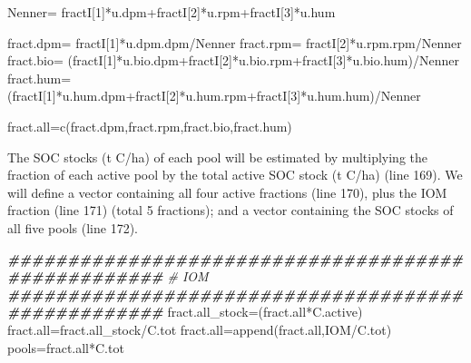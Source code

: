 \documentclass[
  10pt,
  b5paper,
]{book}
\newenvironment{Shaded}{\begin{snugshade}}{\end{snugshade}}
\newcommand{\CommentTok}[1]{\textcolor[rgb]{0.56,0.35,0.01}{\textit{#1}}}
\newcommand{\DecValTok}[1]{\textcolor[rgb]{0.00,0.00,0.81}{#1}}
\newcommand{\DocumentationTok}[1]{\textcolor[rgb]{0.56,0.35,0.01}{\textbf{\textit{#1}}}}
\newcommand{\FunctionTok}[1]{\textcolor[rgb]{0.00,0.00,0.00}{#1}}
\newcommand{\NormalTok}[1]{#1}
\newcommand{\OtherTok}[1]{\textcolor[rgb]{0.56,0.35,0.01}{#1}}
\newcommand{\SpecialCharTok}[1]{\textcolor[rgb]{0.00,0.00,0.00}{#1}}
\begin{document}
\begin{Shaded}
\begin{Highlighting}[]
\NormalTok{Nenner}\OtherTok{=}\NormalTok{ fractI[}\DecValTok{1}\NormalTok{]}\SpecialCharTok{*}\NormalTok{u.dpm}\SpecialCharTok{+}\NormalTok{fractI[}\DecValTok{2}\NormalTok{]}\SpecialCharTok{*}\NormalTok{u.rpm}\SpecialCharTok{+}\NormalTok{fractI[}\DecValTok{3}\NormalTok{]}\SpecialCharTok{*}\NormalTok{u.hum}
  
\NormalTok{  fract.dpm}\OtherTok{=}\NormalTok{ fractI[}\DecValTok{1}\NormalTok{]}\SpecialCharTok{*}\NormalTok{u.dpm.dpm}\SpecialCharTok{/}\NormalTok{Nenner}
\NormalTok{  fract.rpm}\OtherTok{=}\NormalTok{ fractI[}\DecValTok{2}\NormalTok{]}\SpecialCharTok{*}\NormalTok{u.rpm.rpm}\SpecialCharTok{/}\NormalTok{Nenner}
\NormalTok{  fract.bio}\OtherTok{=}\NormalTok{ (fractI[}\DecValTok{1}\NormalTok{]}\SpecialCharTok{*}\NormalTok{u.bio.dpm}\SpecialCharTok{+}\NormalTok{fractI[}\DecValTok{2}\NormalTok{]}\SpecialCharTok{*}\NormalTok{u.bio.rpm}\SpecialCharTok{+}\NormalTok{fractI[}\DecValTok{3}\NormalTok{]}\SpecialCharTok{*}\NormalTok{u.bio.hum)}\SpecialCharTok{/}\NormalTok{Nenner}
\NormalTok{  fract.hum}\OtherTok{=}\NormalTok{ (fractI[}\DecValTok{1}\NormalTok{]}\SpecialCharTok{*}\NormalTok{u.hum.dpm}\SpecialCharTok{+}\NormalTok{fractI[}\DecValTok{2}\NormalTok{]}\SpecialCharTok{*}\NormalTok{u.hum.rpm}\SpecialCharTok{+}\NormalTok{fractI[}\DecValTok{3}\NormalTok{]}\SpecialCharTok{*}\NormalTok{u.hum.hum)}\SpecialCharTok{/}\NormalTok{Nenner   }
  
\NormalTok{  fract.all}\OtherTok{=}\FunctionTok{c}\NormalTok{(fract.dpm,fract.rpm,fract.bio,fract.hum)}
\end{Highlighting}
\end{Shaded}

The SOC stocks (t C/ha) of each pool will be estimated by multiplying the fraction of each active pool by the total active SOC stock (t C/ha) (line 169). We will define a vector containing all four active fractions (line 170), plus the IOM fraction (line 171) (total 5 fractions); and a vector containing the SOC stocks of all five pools (line 172).

\begin{Shaded}
\begin{Highlighting}[]
\DocumentationTok{\#\#\#\#\#\#\#\#\#\#\#\#\#\#\#\#\#\#\#\#\#\#\#\#\#\#\#\#\#\#\#\#\#\#\#\#\#\#\#\#\#\#\#\#\#\#\#\#\#\#\#}
  \CommentTok{\# IOM}
  \DocumentationTok{\#\#\#\#\#\#\#\#\#\#\#\#\#\#\#\#\#\#\#\#\#\#\#\#\#\#\#\#\#\#\#\#\#\#\#\#\#\#\#\#\#\#\#\#\#\#\#\#\#\#\#}
\NormalTok{  fract.all\_stock}\OtherTok{=}\NormalTok{(fract.all}\SpecialCharTok{*}\NormalTok{C.active)}
\NormalTok{  fract.all}\OtherTok{=}\NormalTok{fract.all\_stock}\SpecialCharTok{/}\NormalTok{C.tot}
\NormalTok{  fract.all}\OtherTok{=}\FunctionTok{append}\NormalTok{(fract.all,IOM}\SpecialCharTok{/}\NormalTok{C.tot)}
\NormalTok{  pools}\OtherTok{=}\NormalTok{fract.all}\SpecialCharTok{*}\NormalTok{C.tot}
\end{Highlighting}
\end{Shaded}
\end{document}
